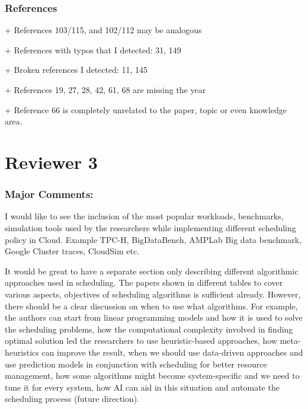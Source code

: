 \subsubsection{References}

+ References 103/115, and 102/112 may be analogous


+ References with typos that I detected: 31, 149


+ Broken references I detected: 11, 145


+ References 19, 27, 28, 42, 61, 68 are missing the year



+ Reference 66 is completely unrelated to the paper, topic or even
knowledge area.



\section{Reviewer 3}

\subsubsection{Major Comments:}

I would like to see the inclusion of the most popular workloads,
benchmarks, simulation tools used by the researchers while
implementing different scheduling policy in Cloud. Example TPC-H,
BigDataBench, AMPLab Big data benchmark, Google Cluster traces,
CloudSim etc.


It would be great to have a separate section only describing different
algorithmic approaches used in scheduling. The papers shown in
different tables to cover various aspects, objectives of scheduling
algorithms is sufficient already. However, there should be a clear
discussion on when to use what algorithms. For example, the authors
can start from linear programming models and how it is used to solve
the scheduling problems, how the computational complexity involved in
finding optimal solution led the researchers to use heuristic-based
approaches, how meta-heuristics can improve the result, when we should
use data-driven approaches and use prediction models in conjunction
with scheduling for better resource management, how some algorithms
might become system-specific and we need to tune it for every system,
how AI can aid in this situation and automate the scheduling process
(future direction).

